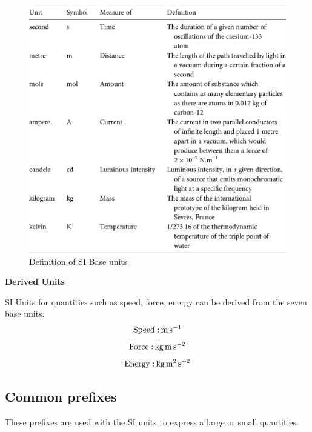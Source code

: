 \documentclass[
  14pt,
]{extarticle}
\renewenvironment{quote}{\begin{myquote}}{\end{myquote}}
\begin{document}
\begin{figure}
\centering
\includegraphics{./images/2022-06-12-22-49-50.png}
\caption{Definition of SI Base units}
\end{figure}

\begin{quote}
\textbf{Derived Units}

SI Units for quantities such as speed, force, energy can be derived from
the seven base units.
\[{\mathrm{Speed:}\mkern3mu \mathrm{m}\mkern3mu \mathrm{s^{-1}}}\]
\[{\mathrm{Force:}\mkern3mu \mathrm{kg}\mkern3mu \mathrm{m}\mkern3mu \mathrm{s^{-2}}}\]
\[{\mathrm{Energy:}\mkern3mu \mathrm{kg}\mkern3mu \mathrm{m^{2}}\mkern3mu \mathrm{s^{-2}}}\]
\end{quote}

\hypertarget{common-prefixes}{%
\subsection{Common prefixes}\label{common-prefixes}}

These prefixes are used with the SI units to express a large or small
quantities.
\end{document}
